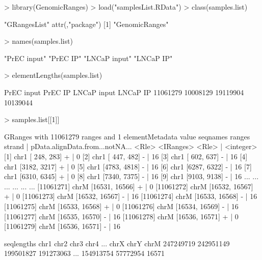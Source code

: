 \begin{Schunk}
\begin{Sinput}
> library(GenomicRanges)
> load("samplesList.RData")
> class(samples.list)
\end{Sinput}
\begin{Soutput}
[1] "GRangesList"
attr(,"package")
[1] "GenomicRanges"
\end{Soutput}
\begin{Sinput}
> names(samples.list)
\end{Sinput}
\begin{Soutput}
[1] "PrEC input"  "PrEC IP"     "LNCaP input" "LNCaP IP"   
\end{Soutput}
\begin{Sinput}
> elementLengths(samples.list)
\end{Sinput}
\begin{Soutput}
 PrEC input     PrEC IP LNCaP input    LNCaP IP 
   11061279    10008129    19119904    10139044 
\end{Soutput}
\begin{Sinput}
> samples.list[[1]]
\end{Sinput}
\begin{Soutput}
GRanges with 11061279 ranges and 1 elementMetadata value
           seqnames         ranges strand   | pData.alignData.from...notNA...
              <Rle>      <IRanges>  <Rle>   |                       <integer>
       [1]     chr1   [ 248,  283]      +   |                               0
       [2]     chr1   [ 447,  482]      -   |                              16
       [3]     chr1   [ 602,  637]      -   |                              16
       [4]     chr1   [3182, 3217]      +   |                               0
       [5]     chr1   [4783, 4818]      -   |                              16
       [6]     chr1   [6287, 6322]      -   |                              16
       [7]     chr1   [6310, 6345]      +   |                               0
       [8]     chr1   [7340, 7375]      -   |                              16
       [9]     chr1   [9103, 9138]      -   |                              16
       ...      ...            ...    ... ...                             ...
[11061271]     chrM [16531, 16566]      +   |                               0
[11061272]     chrM [16532, 16567]      +   |                               0
[11061273]     chrM [16532, 16567]      -   |                              16
[11061274]     chrM [16533, 16568]      -   |                              16
[11061275]     chrM [16533, 16568]      +   |                               0
[11061276]     chrM [16534, 16569]      -   |                              16
[11061277]     chrM [16535, 16570]      -   |                              16
[11061278]     chrM [16536, 16571]      +   |                               0
[11061279]     chrM [16536, 16571]      -   |                              16

seqlengths
      chr1      chr2      chr3      chr4 ...      chrX      chrY      chrM
 247249719 242951149 199501827 191273063 ... 154913754  57772954     16571
\end{Soutput}
\end{Schunk}
